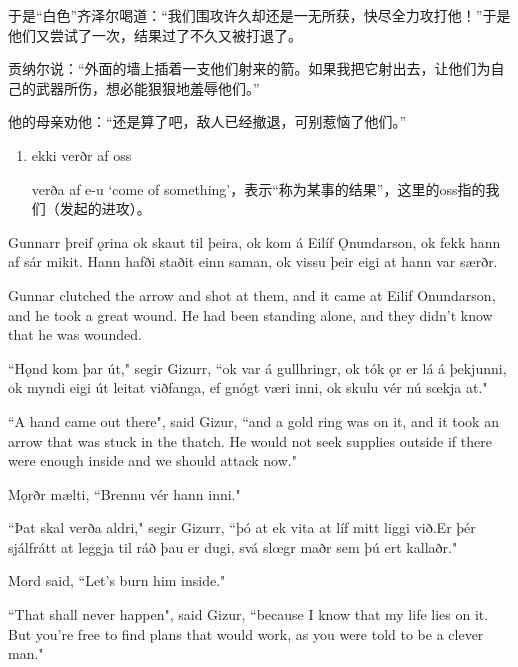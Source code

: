 \begin{translation*}{}
    于是“白色”齐泽尔喝道：“我们围攻许久却还是一无所获，快尽全力攻打他！”于是他们又尝试了一次，结果过了不久又被打退了。

    贡纳尔说：“外面的墙上插着一支他们射来的箭。如果我把它射出去，让他们为自己的武器所伤，想必能狠狠地羞辱他们。”

    他的母亲劝他：“还是算了吧，敌人已经撤退，可别惹恼了他们。”
\end{translation*}
\begin{grammar*}{}
    \begin{enumerate}[leftmargin=*]
        \item ekki verðr af oss

              verða af e-u `come of something'，表示“称为某事的结果”，这里的oss指的我们（发起的进攻）。
    \end{enumerate}
\end{grammar*}
\begin{paracol}{2}
    Gunnarr þreif ǫrina ok skaut til þeira, ok kom á Eilíf Ǫnundarson, ok fekk hann af sár mikit. Hann hafði staðit einn saman, ok vissu þeir eigi at hann var særðr.

    \switchcolumn
    Gunnar clutched the arrow and shot at them, and it came at Eilif Onundarson, and he took a great wound. He had been standing alone, and they didn't know that he was wounded.

    \switchcolumn*

    ``Hǫnd kom þar út," segir Gizurr, ``ok var á gullhringr, ok tók ǫr er lá á þekjunni, ok myndi eigi út leitat viðfanga, ef gnógt væri inni, ok skulu vér nú sœkja at."

    \switchcolumn

    ``A hand came out there", said Gizur, ``and a gold ring was on it, and it took an arrow that was stuck in the thatch. He would not seek supplies outside if there were enough inside and we should attack now."

    \switchcolumn*

    Mǫrðr mælti, ``Brennu vér hann inni."

    ``Þat skal verða aldri," segir Gizurr, ``þó at ek vita at líf mitt liggi við.\footnotemark Er þér sjálfrátt at leggja til ráð þau er dugi, svá slœgr maðr sem þú ert kallaðr."

    \switchcolumn

    Mord said, ``Let's burn him inside."

    ``That shall never happen", said Gizur, ``because I know that my life lies on it. But you're free to find plans that would work, as you were told to be a clever man."
\end{paracol}


